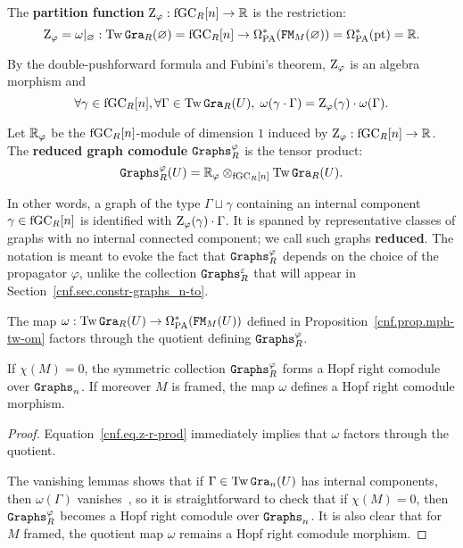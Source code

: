 \begin{definition}
  The \textbf{partition function} $\mathrm{Z}_{\varphi} : \mathrm{fGC}_{R}[n] \to \mathbb{R}$ is the restriction:
  \[\mathrm{Z}_{\varphi} = \omega|_{\varnothing} : \operatorname{Tw}\mathtt{Gra}_{R}(\varnothing) = \mathrm{fGC}_{R}[n] \to \Omega_{\mathrm{PA}}^{*}(\mathtt{FM}_{M}(\varnothing)) = \Omega_{\mathrm{PA}}^{*}(\mathrm{pt}) = \mathbb{R}. \]
\end{definition}

By the double-pushforward formula and Fubini's theorem, $\mathrm{Z}_{\varphi}$ is an algebra morphism and
\begin{equation}
  \label{cnf.eq.z-r-prod}
  \forall \gamma \in \mathrm{fGC}_{R}[n], \forall \Gamma \in \operatorname{Tw}\mathtt{Gra}_{R}(U), \; \omega(\gamma \cdot \Gamma) = \mathrm{Z}_{\varphi}(\gamma) \cdot \omega(\Gamma).
\end{equation}

\begin{definition}
  Let $\mathbb{R}_{\varphi}$ be the $\mathrm{fGC}_{R}[n]$-module of dimension $1$ induced by $\mathrm{Z}_{\varphi} : \mathrm{fGC}_{R}[n] \to \mathbb{R}$.
  The \textbf{reduced graph comodule} $\mathtt{Graphs}^{\varphi}_{R}$ is the tensor product:
  \[ \mathtt{Graphs}^{\varphi}_{R}(U) = \mathbb{R}_{\varphi} \otimes_{\mathrm{fGC}_{R}[n]} \operatorname{Tw}\mathtt{Gra}_{R}(U). \]
\end{definition}

In other words, a graph of the type $\Gamma \sqcup \gamma$ containing an internal component $\gamma \in \mathrm{fGC}_{R}[n]$ is identified with $\mathrm{Z}_{\varphi}(\gamma) \cdot \Gamma$.
It is spanned by representative classes of graphs with no internal connected component; we call such graphs \textbf{reduced}.
The notation is meant to evoke the fact that $\mathtt{Graphs}^{\varphi}_{R}$ depends on the choice of the propagator $\varphi$, unlike the collection $\mathtt{Graphs}^{\varepsilon}_{R}$ that will appear in Section~\ref{cnf.sec.constr-graphs_n-to}.

\begin{proposition}
  \label{cnf.prop.mph-1}
  The map $\omega : \operatorname{Tw}\mathtt{Gra}_{R}(U) \to \Omega_{\mathrm{PA}}^{*}(\mathtt{FM}_{M}(U))$ defined in Proposition~\ref{cnf.prop.mph-tw-om} factors through the quotient defining $\mathtt{Graphs}^{\varphi}_{R}$.

  If $\chi(M) = 0$, the symmetric collection $\mathtt{Graphs}^{\varphi}_{R}$ forms a Hopf right comodule over $\mathtt{Graphs}_{n}$.
  If moreover $M$ is framed, the map $\omega$ defines a Hopf right comodule morphism.
\end{proposition}

\begin{proof}
  Equation~\eqref{cnf.eq.z-r-prod} immediately implies that $\omega$ factors through the quotient.

  The vanishing lemmas shows that if $\Gamma \in \operatorname{Tw}\mathtt{Gra}_{n}(U)$ has internal components, then $\omega(\Gamma)$ vanishes~\cite[Proposition 9.3.1]{LambrechtsVolic2014}, so it is straightforward to check that if $\chi(M) = 0$, then $\mathtt{Graphs}^{\varphi}_{R}$ becomes a Hopf right comodule over $\mathtt{Graphs}_{n}$.
  It is also clear that for $M$ framed, the quotient map $\omega$ remains a Hopf right comodule morphism.
\end{proof}

